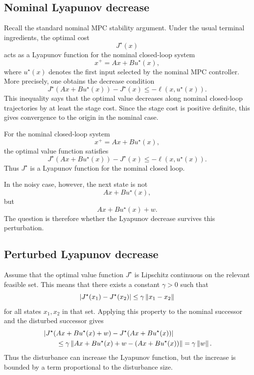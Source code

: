 \subsection{Nominal Lyapunov decrease}

Recall the standard nominal MPC stability argument. Under the usual terminal ingredients, the
optimal cost
\[
    J^\star(x)
\]
acts as a Lyapunov function for the nominal closed-loop system
\[
    x^+=Ax+Bu^\star(x),
\]
where \(u^\star(x)\) denotes the first input selected by the nominal MPC controller. More
precisely, one obtains the decrease condition
\[
    J^\star(Ax+Bu^\star(x))-J^\star(x)
    \leq
    -\ell(x,u^\star(x)).
\]
This inequality says that the optimal value decreases along nominal closed-loop trajectories by
at least the stage cost. Since the stage cost is positive definite, this gives convergence to the
origin in the nominal case.

\begin{theorembox}
For the nominal closed-loop system
\[
    x^+=Ax+Bu^\star(x),
\]
the optimal value function satisfies
\[
    J^\star(Ax+Bu^\star(x))-J^\star(x)
    \leq
    -\ell(x,u^\star(x)).
\]
Thus \(J^\star\) is a Lyapunov function for the nominal closed loop.
\end{theorembox}

In the noisy case, however, the next state is not
\[
    Ax+Bu^\star(x),
\]
but
\[
    Ax+Bu^\star(x)+w.
\]
The question is therefore whether the Lyapunov decrease survives this perturbation.

\subsection{Perturbed Lyapunov decrease}

Assume that the optimal value function \(J^\star\) is Lipschitz continuous on the relevant
feasible set. This means that there exists a constant \(\gamma>0\) such that
\[
    |J^\star(x_1)-J^\star(x_2)|
    \leq
    \gamma\left\lVert x_1-x_2 \right\rVert
\]
for all states \(x_1,x_2\) in that set. Applying this property to the nominal successor and the
disturbed successor gives
\[
\begin{aligned}
&
\left|
J^\star(Ax+Bu^\star(x)+w)
-
J^\star(Ax+Bu^\star(x))
\right|
\\
&\qquad\leq
\gamma
\left\lVert 
Ax+Bu^\star(x)+w
-
(Ax+Bu^\star(x))
 \right\rVert
=
\gamma\left\lVert w \right\rVert.
\end{aligned}
\]
Thus the disturbance can increase the Lyapunov function, but the increase is bounded by a term
proportional to the disturbance size.\\

